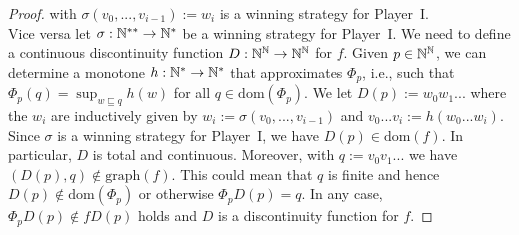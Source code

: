 \documentclass[10pt,a4paper]{amsart}
\def\IN{{\Bbb{N}}}
\def\dom{{\mathrm{dom}}}
\def\graph{{\mathrm{graph}}}
\def\prefix{\sqsubseteq}
\begin{document}
\begin{proof}
with $\sigma(v_0,...,v_{i-1}):=w_i$ is a winning strategy for Player~I.\smallskip\\
Vice versa let  $\sigma:\IN^{**}\to\IN^*$ be a winning strategy for Player~I.
We need to define a continuous discontinuity function $D:\IN^\IN\to\IN^\IN$ for $f$.
Given $p\in\IN^\IN$, we can determine a monotone $h:\IN^*\to\IN^*$ that approximates $\Phi_p$, i.e., 
such that $\Phi_p(q)=\sup_{w\prefix q}h(w)$ for all $q\in\dom(\Phi_p)$. 
We let $D(p):=w_0w_1...$
where the $w_i$ are inductively given by $w_i:=\sigma(v_0,...,v_{i-1})$
and $v_0...v_i:=h(w_0...w_i)$.
Since $\sigma$ is a winning strategy for Player~I, we have $D(p)\in\dom(f)$. In particular, $D$ is total and continuous.
Moreover, with $q:=v_0v_1...$ we have $(D(p),q)\not\in\graph(f)$.
This could mean that $q$ is finite and hence $D(p)\not\in\dom(\Phi_p)$ 
or otherwise $\Phi_pD(p)=q$. In any case, $\Phi_pD(p)\not\in fD(p)$ holds and $D$ is a discontinuity function
for $f$.
\end{proof}
\end{document}
